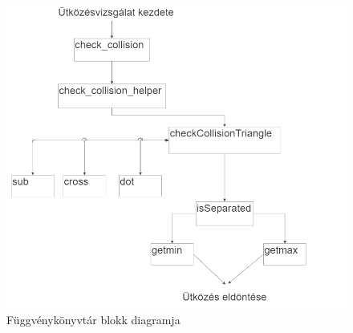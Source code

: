 \begin{figure}[h]
	\centering
	\includegraphics[width=15truecm, height=15truecm]{images/blokk_diagram.png}
	\caption{Függvénykönyvtár blokk diagramja}
	\label{fig:blokkdiagram}
\end{figure}


\newpage



